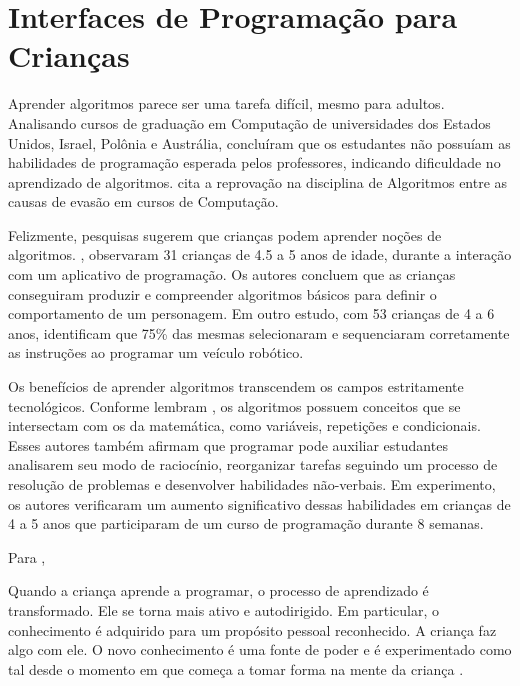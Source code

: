 \section{Interfaces de Programação para Crianças}
\label{section_interfaces}

Aprender algoritmos parece ser uma tarefa difícil, mesmo para adultos. Analisando cursos de graduação em Computação de universidades dos Estados Unidos, Israel, Polônia e Austrália,  concluíram que os estudantes não possuíam as habilidades de programação esperada pelos professores, indicando dificuldade no aprendizado de algoritmos.  cita a reprovação na disciplina de Algoritmos entre as causas de evasão em cursos de Computação. 

Felizmente, pesquisas sugerem que crianças podem aprender noções de algoritmos. , observaram 31 crianças de 4.5 a 5 anos de idade, durante a interação com um aplicativo de programação. Os autores concluem que as crianças conseguiram produzir e compreender algoritmos básicos para definir o comportamento de um personagem. Em outro estudo, com 53 crianças de 4 a 6 anos,  identificam que 75\% das mesmas selecionaram e sequenciaram corretamente as instruções ao programar um veículo robótico. 

Os benefícios de aprender algoritmos transcendem os campos estritamente tecnológicos. Conforme lembram , os algoritmos possuem conceitos que se intersectam com os da matemática, como variáveis, repetições e condicionais. Esses autores também afirmam que programar pode auxiliar estudantes analisarem seu modo de raciocínio, reorganizar tarefas seguindo um processo de resolução de problemas e desenvolver habilidades não-verbais. Em experimento, os autores verificaram um aumento significativo dessas habilidades em crianças de 4 a 5 anos que participaram de um curso de programação durante 8 semanas.

Para , 

\begin{citacao}
Quando a criança aprende a programar, o processo de aprendizado é transformado. Ele se torna mais ativo e autodirigido. Em particular, o conhecimento é adquirido para um propósito pessoal reconhecido. A criança faz algo com ele. O novo conhecimento é uma fonte de poder e é experimentado como tal desde o momento em que começa a tomar forma na mente da criança \cite[p.21, tradução nossa]{papert_exploration_1996}.
\end{citacao}


